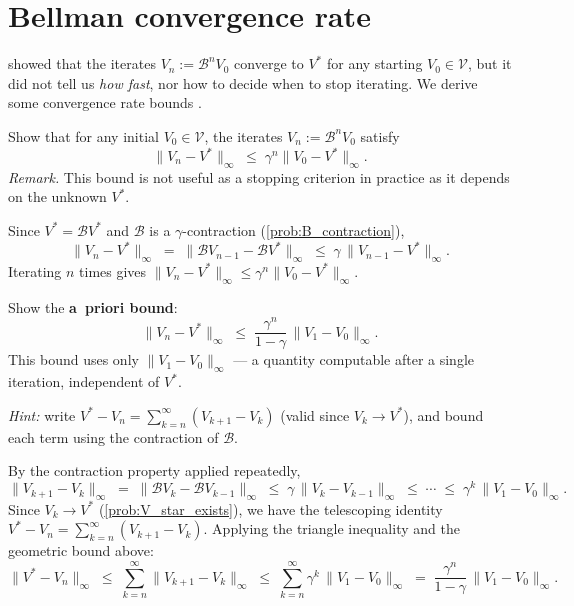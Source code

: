 \documentclass[11pt]{article}
\begin{document}


\section{Bellman convergence rate}\label{prob:convergence_rate}

 showed that the iterates $V_n := \mathcal{B}^n V_0$ converge to $V^*$ for any starting $V_0 \in \mathcal{V}$, but it did not tell us \emph{how fast}, nor how to decide when to stop iterating. We derive some convergence rate bounds \cite[Chapter~6]{putermanMarkovDecisionProcesses1994}.

\begin{exercise}
\label{prob:geometric_decay} Show that for any initial $V_0 \in \mathcal{V}$, the iterates $V_n := \mathcal{B}^n V_0$ satisfy
$$
\|V_n - V^*\|_\infty \;\le\; \gamma^n \|V_0 - V^*\|_\infty.
$$
\emph{Remark.} This bound is not useful as a stopping criterion in practice as it depends on the unknown $V^*$.
\end{exercise}

\begin{solution}
Since $V^* = \mathcal{B} V^*$ and $\mathcal{B}$ is a $\gamma$-contraction (\cref{prob:B_contraction}),
$$
\|V_n - V^*\|_\infty \;=\; \|\mathcal{B} V_{n-1} - \mathcal{B} V^*\|_\infty \;\le\; \gamma\, \|V_{n-1} - V^*\|_\infty.
$$
Iterating $n$ times gives $\|V_n - V^*\|_\infty \le \gamma^n \|V_0 - V^*\|_\infty$.
\end{solution}

\begin{exercise}
\label{prob:a_priori_bound} Show the \textbf{a~priori bound}:
$$
\|V_n - V^*\|_\infty \;\le\; \frac{\gamma^n}{1-\gamma}\, \|V_1 - V_0\|_\infty.
$$
This bound uses only $\|V_1 - V_0\|_\infty$ --- a quantity computable after a single iteration, independent of $V^*$.

\textit{Hint:} write $V^* - V_n = \sum_{k=n}^{\infty}(V_{k+1} - V_k)$ (valid since $V_k \to V^*$), and bound each term using the contraction of $\mathcal{B}$.
\end{exercise}

\begin{solution}
By the contraction property applied repeatedly,
$$
\|V_{k+1} - V_k\|_\infty \;=\; \|\mathcal{B} V_k - \mathcal{B} V_{k-1}\|_\infty \;\le\; \gamma\, \|V_k - V_{k-1}\|_\infty \;\le\; \cdots \;\le\; \gamma^k\, \|V_1 - V_0\|_\infty.
$$
Since $V_k \to V^*$ (\cref{prob:V_star_exists}), we have the telescoping identity $V^* - V_n = \sum_{k=n}^{\infty}(V_{k+1} - V_k)$. Applying the triangle inequality and the geometric bound above:
$$
\|V^* - V_n\|_\infty \;\le\; \sum_{k=n}^{\infty} \|V_{k+1} - V_k\|_\infty \;\le\; \sum_{k=n}^{\infty} \gamma^k\, \|V_1 - V_0\|_\infty \;=\; \frac{\gamma^n}{1-\gamma}\, \|V_1 - V_0\|_\infty.
$$
\end{solution}
\end{document}
